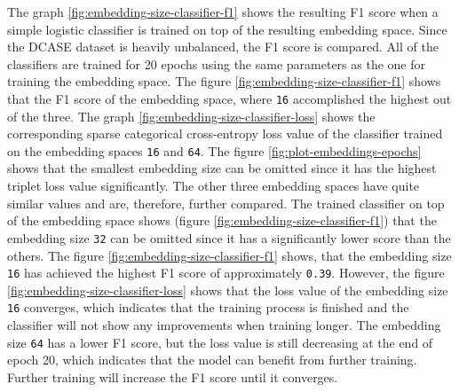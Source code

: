 The graph \ref{fig:embedding-size-classifier-f1} shows the resulting F1 score when a simple logistic classifier is trained on top of the resulting embedding space. Since the \gls{DCASE} dataset is heavily unbalanced, the F1 score is compared. All of the classifiers are trained for 20 epochs using the same parameters as the one for training the embedding space. The figure \ref{fig:embedding-size-classifier-f1} shows that the F1 score of the embedding space, where \texttt{16} accomplished the highest out of the three. The graph \ref{fig:embedding-size-classifier-loss} shows the corresponding sparse categorical cross-entropy loss value of the classifier trained on the embedding spaces \texttt{16} and \texttt{64}.
\newline
\newline
The figure \ref{fig:plot-embeddings-epochs} shows that the smallest embedding size can be omitted since it has the highest triplet loss value significantly. The other three embedding spaces have quite similar values and are, therefore, further compared. The trained classifier on top of the embedding space shows (figure \ref{fig:embedding-size-classifier-f1}) that the embedding size \texttt{32} can be omitted since it has a significantly lower score than the others. The figure \ref{fig:embedding-size-classifier-f1} shows, that the embedding size \texttt{16} has achieved the highest F1 score of approximately \texttt{0.39}. However, the figure \ref{fig:embedding-size-classifier-loss} shows that the loss value of the embedding size \texttt{16} converges, which indicates that the training process is finished and the classifier will not show any improvements when training longer. The embedding size \texttt{64} has a lower F1 score, but the loss value is still decreasing at the end of epoch 20, which indicates that the model can benefit from further training. Further training will increase the F1 score until it converges.
